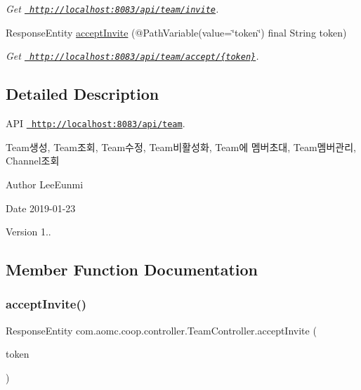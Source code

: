 \begin{DoxyCompactItemize}
\begin{DoxyCompactList}\small\item\em Get \href{http://localhost:8083/api/team/invite}{\texttt{ http\+://localhost\+:8083/api/team/invite}}. \end{DoxyCompactList}\item 
Response\+Entity \mbox{\hyperlink{classcom_1_1aomc_1_1coop_1_1controller_1_1_team_controller_aeb6c3157b6aa955e2b4481d86d039b89}{accept\+Invite}} (@Path\+Variable(value=\char`\"{}token\char`\"{}) final String token)
\begin{DoxyCompactList}\small\item\em Get \href{http://localhost:8083/api/team/accept/{token}}{\texttt{ http\+://localhost\+:8083/api/team/accept/\{token\}}}. \end{DoxyCompactList}\end{DoxyCompactItemize}


\subsection{Detailed Description}
A\+PI \href{http://localhost:8083/api/team}{\texttt{ http\+://localhost\+:8083/api/team}}. 

Team생성, Team조회, Team수정, Team비활성화, Team에 멤버초대, Team멤버관리, Channel조회 \begin{DoxyAuthor}{Author}
Lee\+Eunmi 
\end{DoxyAuthor}
\begin{DoxyDate}{Date}
2019-\/01-\/23 
\end{DoxyDate}
\begin{DoxyVersion}{Version}
1.. 
\end{DoxyVersion}


\subsection{Member Function Documentation}
\mbox{\label{classcom_1_1aomc_1_1coop_1_1controller_1_1_team_controller_aeb6c3157b6aa955e2b4481d86d039b89}} 
\subsubsection{\texorpdfstring{acceptInvite()}{acceptInvite()}}
{\footnotesize\ttfamily Response\+Entity com.\+aomc.\+coop.\+controller.\+Team\+Controller.\+accept\+Invite (\begin{DoxyParamCaption}\item[{@Path\+Variable(value=\char`\"{}token\char`\"{}) final String}]{token }\end{DoxyParamCaption})}



